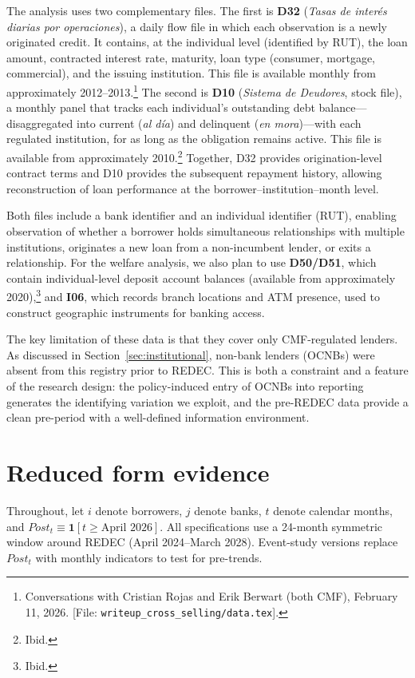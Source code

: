 \documentclass[12pt]{article}
\theoremstyle{plain}
\theoremstyle{plain}
\begin{document}
The analysis uses two complementary files. The first is \textbf{D32} (\textit{Tasas de inter\'es diarias por operaciones}), a daily flow file in which each observation is a newly originated credit. It contains, at the individual level (identified by RUT), the loan amount, contracted interest rate, maturity, loan type (consumer, mortgage, commercial), and the issuing institution. This file is available monthly from approximately 2012--2013.\footnote{Conversations with Cristian Rojas and Erik Berwart (both CMF), February 11, 2026. [File: \texttt{writeup\_cross\_selling/data.tex}].} The second is \textbf{D10} (\textit{Sistema de Deudores}, stock file), a monthly panel that tracks each individual's outstanding debt balance—disaggregated into current (\textit{al d\'ia}) and delinquent (\textit{en mora})—with each regulated institution, for as long as the obligation remains active. This file is available from approximately 2010.\footnote{Ibid.} Together, D32 provides origination-level contract terms and D10 provides the subsequent repayment history, allowing reconstruction of loan performance at the borrower--institution--month level.

Both files include a bank identifier and an individual identifier (RUT), enabling observation of whether a borrower holds simultaneous relationships with multiple institutions, originates a new loan from a non-incumbent lender, or exits a relationship. For the welfare analysis, we also plan to use \textbf{D50/D51}, which contain individual-level deposit account balances (available from approximately 2020),\footnote{Ibid.} and \textbf{I06}, which records branch locations and ATM presence, used to construct geographic instruments for banking access.

The key limitation of these data is that they cover only CMF-regulated lenders. As discussed in Section~\ref{sec:institutional}, non-bank lenders (OCNBs) were absent from this registry prior to REDEC. This is both a constraint and a feature of the research design: the policy-induced entry of OCNBs into reporting generates the identifying variation we exploit, and the pre-REDEC data provide a clean pre-period with a well-defined information environment.

\section{Reduced form evidence}

Throughout, let $i$ denote borrowers, $j$ denote banks, $t$ denote calendar months, and $Post_t \equiv \mathbf{1}[t \geq \text{April 2026}]$. All specifications use a 24-month symmetric window around REDEC (April 2024--March 2028). Event-study versions replace $Post_t$ with monthly indicators to test for pre-trends.
\end{document}
